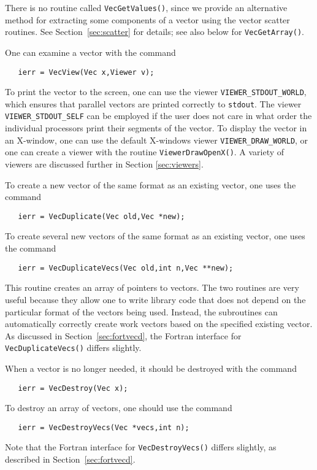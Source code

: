 There is no routine called {\tt VecGetValues()}, since we provide 
an alternative method for extracting some components of a vector using
the vector scatter routines.  See Section~\ref{sec:scatter} for details; see also
below for {\tt VecGetArray()}.

One can examine a vector with the command 
\begin{verbatim}
   ierr = VecView(Vec x,Viewer v);
\end{verbatim}
To print the vector to the screen, one can use the viewer
 {\tt VIEWER\_STDOUT\_WORLD}, which ensures
that parallel vectors are printed correctly to {\tt stdout}.  The
viewer {\tt VIEWER\_STDOUT\_SELF}  
can be employed if
the user does not care in what order the individual processors print
their segments of the vector.  To display the vector in an X-window,
one can use the default X-windows viewer {\tt VIEWER\_DRAW\_WORLD},
or one can create a viewer with the routine {\tt ViewerDrawOpenX()}.
A variety of viewers are discussed further in Section \ref{sec:viewers}.

To create a new vector of the same format as an existing vector, one uses
the command 
\begin{verbatim}
   ierr = VecDuplicate(Vec old,Vec *new);
\end{verbatim}
To create several new vectors of the same format as an existing vector,
one uses the command 
\begin{verbatim}
   ierr = VecDuplicateVecs(Vec old,int n,Vec **new);
\end{verbatim}
This routine creates an array of pointers to vectors. The two routines 
are very useful because they allow one to write library code that does 
not depend on the particular format of the vectors being used. Instead,
the subroutines can automatically correctly create work vectors
based on the specified existing vector.  As discussed in 
Section~\ref{sec:fortvecd}, the Fortran interface for {\tt VecDuplicateVecs()}
differs slightly.

When a vector is no longer needed, it should be destroyed with the 
command 
\begin{verbatim}
   ierr = VecDestroy(Vec x);
\end{verbatim}
To destroy an array of vectors, one should use the command 
\begin{verbatim}
   ierr = VecDestroyVecs(Vec *vecs,int n);
\end{verbatim}
Note that the Fortran interface for {\tt VecDestroyVecs()} differs slightly,
as described in Section~\ref{sec:fortvecd}.


